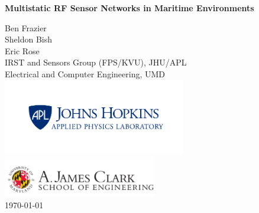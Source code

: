 \titlepage
\begin{center}
\vspace*{25pt}
{\huge \bfseries Multistatic RF Sensor Networks in Maritime Environments\\}

\vspace{75 pt}

\large Ben Frazier \\
\large Sheldon Bish \\
\large Eric Rose \\
 \small IRST and Sensors Group (FPS/KVU), JHU/APL \\
\small Electrical and Computer Engineering, UMD \\
\includegraphics[width=0.6\textwidth]{../media/apl_small_horizontal_blue} \\
\includegraphics[width=0.5\textwidth]{../media/clark}\\
\vspace{25pt}
\large \today
\end{center}